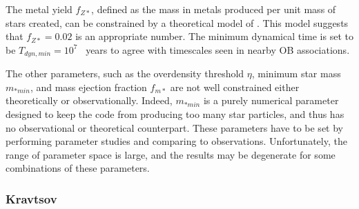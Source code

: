 The metal yield $f_{Z*}$, defined as the mass in metals produced per unit
mass of stars created, can be constrained by a theoretical model of
 \citet{1995ApJS..101..181W}.  This model suggests that $f_{Z*} = 0.02$
is an appropriate number.  The minimum dynamical time is set to be $T_{dyn,min} = 10^7$
~years to agree with timescales seen in nearby OB associations.

The other parameters, such as the overdensity threshold $\eta$, minimum star
 mass $m_{*min}$, and mass ejection fraction $f_{m*}$ are not well constrained 
either theoretically or observationally.  Indeed, $m_{*min}$ is a purely
numerical parameter designed to keep the code from producing too many star 
particles, and thus has no observational or theoretical counterpart.  These
parameters have to be set by performing parameter studies and comparing to 
observations.  Unfortunately, the range of parameter space is large, and
the results may be degenerate for some combinations of these parameters.



\subsubsection{Kravtsov}
\label{sec:starform_kravtsov}



